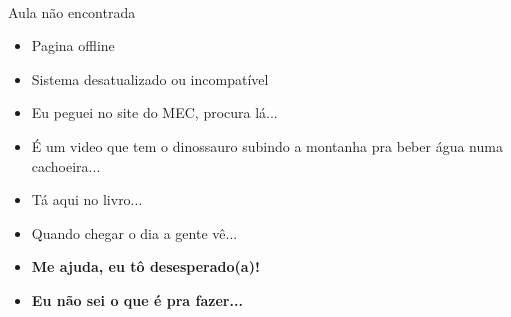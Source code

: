 \begin{multicols}{2}

			\vfill \null
			\columnbreak
			
			\begin{center}
				\\
				\vspace*{5mm}
				{\Huge Aula não encontrada}
			\end{center}

	\vfill\null
	\columnbreak
	
	\begin{itemize}
				\item Pagina offline
				\item Sistema desatualizado ou incompatível
				\item Eu peguei no site do MEC, procura lá...
				\item É um video que tem o dinossauro subindo a montanha pra beber água numa cachoeira...
				\item Tá aqui no livro...
				\item Quando chegar o dia a gente vê...
				\item \textbf{Me ajuda, eu tô desesperado(a)!}
				\item \textbf{Eu não sei o que é pra fazer...}
			\end{itemize}
			
		\end{multicols}
	
